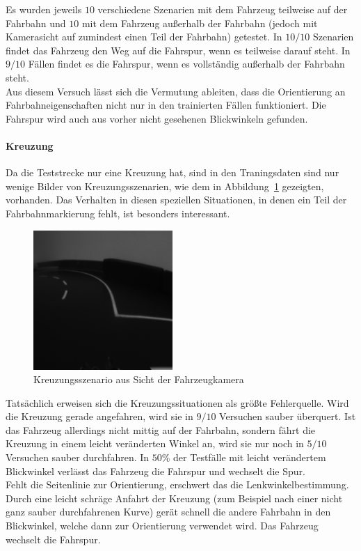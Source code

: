 Es wurden jeweils $10$ verschiedene Szenarien mit dem Fahrzeug teilweise auf der Fahrbahn und $10$ mit dem Fahrzeug außerhalb der Fahrbahn (jedoch mit Kamerasicht auf zumindest einen Teil der Fahrbahn) getestet. In $10/10$ Szenarien findet das Fahrzeug den Weg auf die Fahrspur, wenn es teilweise darauf steht. In $9/10$ Fällen findet es die Fahrspur, wenn es vollständig außerhalb der Fahrbahn steht.\\
Aus diesem Versuch lässt sich die Vermutung ableiten, dass die Orientierung an Fahrbahneigenschaften nicht nur in den trainierten Fällen funktioniert. Die Fahrspur wird auch aus vorher nicht gesehenen Blickwinkeln gefunden.

\paragraph{Kreuzung}
Da die Teststrecke nur eine Kreuzung hat, sind in den Traningsdaten sind nur wenige Bilder von Kreuzungsszenarien, wie dem in Abbildung~\ref{img:szenariokreuzung} gezeigten, vorhanden. Das Verhalten in diesen speziellen Situationen, in denen ein Teil der Fahrbahnmarkierung fehlt, ist besonders interessant.

\begin{figure}[h]
	\centering
	\includegraphics[scale=0.7]{figures/szenarioKreuzung.png}
	\caption{Kreuzungsszenario aus Sicht der Fahrzeugkamera}
	\label{img:szenariokreuzung}
\end{figure}

Tatsächlich erweisen sich die Kreuzungssituationen als größte Fehlerquelle. Wird die Kreuzung gerade angefahren, wird sie in $9/10$ Versuchen sauber überquert. Ist das Fahrzeug allerdings nicht mittig auf der Fahrbahn, sondern fährt die Kreuzung in einem leicht veränderten Winkel an, wird sie nur noch in $5/10$ Versuchen sauber durchfahren. In $50 \%$ der Testfälle mit leicht verändertem Blickwinkel verlässt das Fahrzeug die Fahrspur und wechselt die Spur.\\
Fehlt die Seitenlinie zur Orientierung, erschwert das die Lenkwinkelbestimmung. Durch eine leicht schräge Anfahrt der Kreuzung (zum Beispiel nach einer nicht ganz sauber durchfahrenen Kurve) gerät schnell die andere Fahrbahn in den Blickwinkel, welche dann zur Orientierung verwendet wird. Das Fahrzeug wechselt die Fahrspur.


